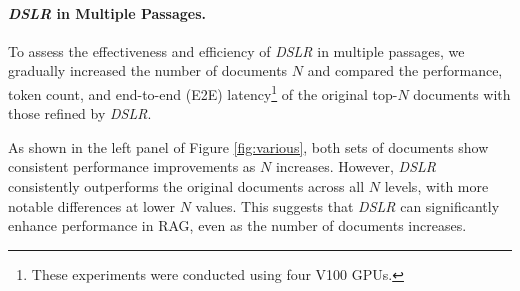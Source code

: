 








\paragraph{\textit{DSLR} in Multiple Passages.}
To assess the effectiveness and efficiency of \textit{DSLR} in multiple passages, we gradually increased the number of documents \(N\) and compared the performance, token count, and end-to-end (E2E) latency\footnote{These experiments were conducted using four V100 GPUs.} of the original top-\(N\) documents with those refined by \textit{DSLR}. 

As shown in the left panel of Figure \ref{fig:various}, both sets of documents show consistent performance improvements as \(N\) increases. However, \textit{DSLR} consistently outperforms the original documents across all \(N\) levels, with more notable differences at lower \(N\) values. This suggests that \textit{DSLR} can significantly enhance performance in RAG, even as the number of documents increases.

